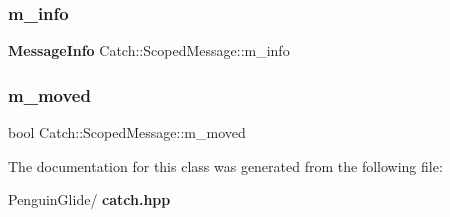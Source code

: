 \subsubsection{m\_info}
{\footnotesize\ttfamily \textbf{ Message\+Info} Catch\+::\+Scoped\+Message\+::m\+\_\+info}

\mbox{\label{class_catch_1_1_scoped_message_a4fe5607c1f7407240a0da8405b1c12e7}} 
\subsubsection{m\_moved}
{\footnotesize\ttfamily bool Catch\+::\+Scoped\+Message\+::m\+\_\+moved}



The documentation for this class was generated from the following file\+:\begin{DoxyCompactItemize}
\item 
Penguin\+Glide/\textbf{ catch.\+hpp}\end{DoxyCompactItemize}
